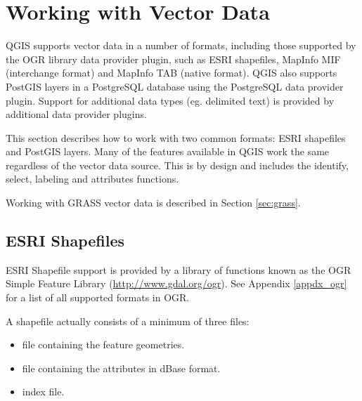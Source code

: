 
\section{Working with Vector Data}\label{label_workingvector}

QGIS supports vector data in a number of formats, including those
supported by the OGR library data provider plugin, such as ESRI shapefiles,
MapInfo MIF (interchange format)
and MapInfo TAB (native format).
QGIS also supports PostGIS
layers in a PostgreSQL database using the PostgreSQL data provider plugin.
Support for
additional data types (eg. delimited text) is provided by additional data provider plugins.

This section describes how to work with two common formats:
ESRI shapefiles and PostGIS layers. Many of the
features available in QGIS work the same regardless of the vector data source.
This is by design and includes the identify, select, labeling and attributes
functions.

Working with GRASS vector data is described in Section \ref{sec:grass}.

\subsection{ESRI Shapefiles}

ESRI Shapefile support is provided by a library of functions known as 
the OGR Simple Feature Library (\url{http://www.gdal.org/ogr}). See Appendix
\ref{appdx_ogr} for a list of all supported formats in OGR.

A shapefile actually consists of a minimum of three
files:

\begin{itemize}
\item {} file containing the feature geometries.
\item {} file containing the attributes in dBase format.
\item {} index file.
\end{itemize}

